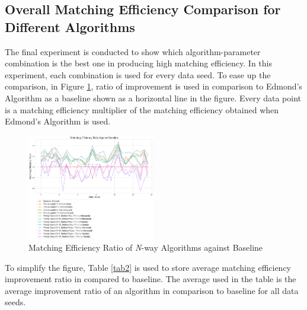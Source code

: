 \documentclass[conference]{IEEEtran}
\begin{document}
\subsection{Overall Matching Efficiency Comparison for Different Algorithms}
The final experiment is conducted to show which algorithm-parameter combination is the best one in producing high matching efficiency.
In this experiment, each combination is used for every data seed. To ease up the comparison, in Figure \ref{matcheffratio}, ratio of improvement is used
in comparison to Edmond's Algorithm as a baseline shown as a horizontal line in the figure. Every data point is a matching efficiency
multiplier of the matching efficiency obtained when Edmond's Algorithm is used.

\begin{figure}[h]
    \includegraphics[width=0.5\textwidth]{images/matching_efficiency_ratio_against_baseline.png}
    \caption{Matching Efficiency Ratio of \textit{N}-way Algorithms against Baseline}
    \label{matcheffratio}
\end{figure}

To simplify the figure, Table \ref{tab2} is used to store average matching efficiency improvement ratio in compared to baseline. The average used
in the table is the average improvement ratio of an algorithm in comparison to baseline for all data seeds.
\end{document}
